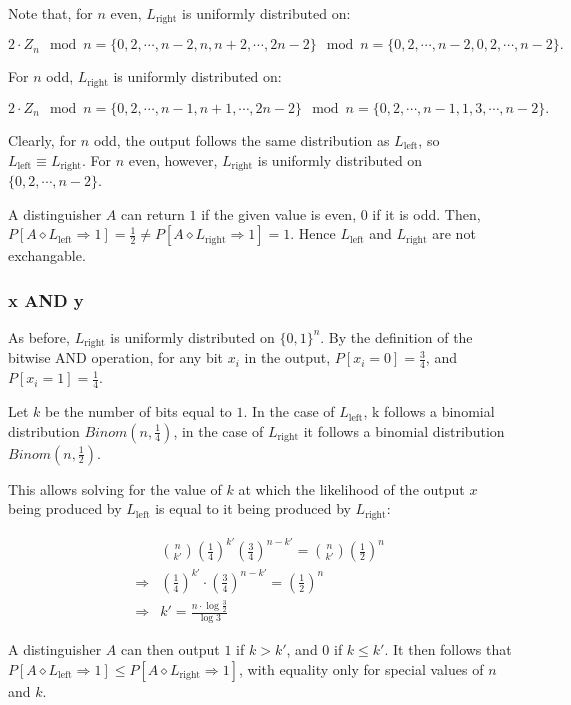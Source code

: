 \documentclass[a4paper]{scrreprt}
\begin{document}
Note that, for $n$ even, $L_{\text{right}}$ is uniformly distributed on:

\[
	2 \cdot Z_n \mod n = \{0, 2, \cdots, n - 2, n, n + 2, \cdots, 2n - 2\} \mod n = \{0, 2, \cdots, n - 2, 0, 2, \cdots, n - 2\}.
\]

For $n$ odd, $L_{\text{right}}$ is uniformly distributed on:

\[
	2 \cdot Z_n \mod n = \{0, 2, \cdots, n - 1, n + 1, \cdots, 2n - 2\} \mod n = \{0, 2, \cdots, n - 1, 1, 3, \cdots, n - 2\}.
\]

Clearly, for $n$ odd, the output follows the same distribution as
$L_{\text{left}}$, so $L_{\text{left}} \equiv L_{\text{right}}$. For $n$ even,
however, $L_{\text{right}}$ is uniformly distributed on $\{0, 2, \cdots,
n-2\}$.

A distinguisher $A$ can return $1$ if the given value is even, $0$ if it is
odd. Then, $P[A \diamond L_{\text{left}} \Rightarrow 1] = \frac{1}{2} \neq P[A
\diamond L_{\text{right}} \Rightarrow 1] = 1$. Hence $L_{\text{left}}$ and
$L_{\text{right}}$ are not exchangable.

\subsubsection{x AND y}

As before, $L_{\text{right}}$ is uniformly distributed on $\{0, 1\}^n$. By the
definition of the bitwise AND operation, for any bit $x_i$ in the output,
$P[x_i = 0] = \frac{3}{4}$, and $P[x_i = 1] = \frac{1}{4}$.

Let $k$ be the number of bits equal to $1$. In the case of $L_{\text{left}}$, k
follows a binomial distribution $Binom(n, \frac{1}{4})$, in the case of
$L_{\text{right}}$ it follows a binomial distribution $Binom(n, \frac{1}{2})$.

This allows solving for the value of $k$ at which the likelihood of the output
$x$ being produced by $L_{\text{left}}$ is equal to it being produced by
$L_{\text{right}}$:

\begin{align*}
	& \binom{n}{k'} \left(\frac{1}{4}\right)^{k'} \left(\frac{3}{4}\right)^{n - k'} = \binom{n}{k'} \left(\frac{1}{2}\right)^n \\
	\Rightarrow & \left(\frac{1}{4}\right)^{k'} \cdot \left(\frac{3}{4}\right)^{n - k'} = \left(\frac{1}{2}\right)^n \\
	\Rightarrow & k' = \frac{n \cdot \log{\frac{3}{2}}}{\log{3}}
\end{align*}

A distinguisher $A$ can then output $1$ if $k > k'$, and $0$ if $k \leq k'$. It
then follows that $P[A \diamond L_{\text{left}} \Rightarrow 1] \leq P[A
\diamond L_{\text{right}} \Rightarrow 1]$, with equality only for special
values of $n$ and $k$.
\end{document}
